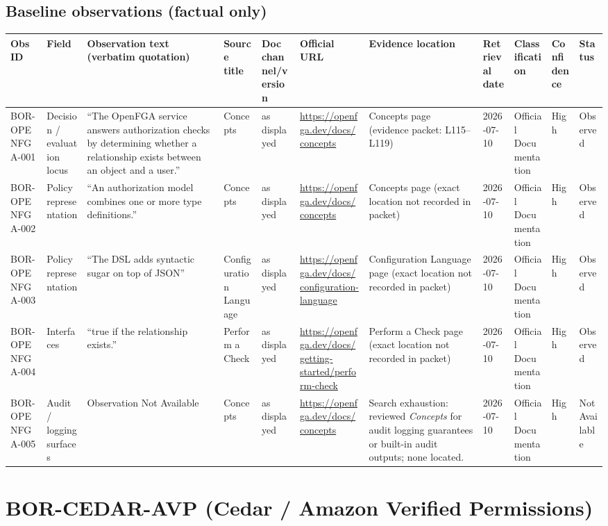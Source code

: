 \documentclass[11pt]{article}
\begin{document}
\subsection*{Baseline observations (factual only)}
\begin{longtable}{@{}L{0.95in}L{1.05in}L{2.05in}L{1.55in}L{0.95in}L{1.55in}L{1.10in}L{0.75in}L{0.95in}L{0.75in}L{0.8in}@{}}
\toprule
Obs ID & Field & Observation text (verbatim quotation) & Source title & Doc channel/version & Official URL & Evidence location & Retrieval date & Classification & Confidence & Status\\
\midrule
\endhead
BOR-OPENFGA-001 & Decision / evaluation locus & ``The OpenFGA service answers authorization checks by determining whether a relationship exists between an object and a user.'' & Concepts & as displayed & \url{https://openfga.dev/docs/concepts} & Concepts page (evidence packet: L115--L119) & 2026-07-10 & Official Documentation & High & Observed\\
BOR-OPENFGA-002 & Policy representation & ``An authorization model combines one or more type definitions.'' & Concepts & as displayed & \url{https://openfga.dev/docs/concepts} & Concepts page (exact location not recorded in packet) & 2026-07-10 & Official Documentation & High & Observed\\
BOR-OPENFGA-003 & Policy representation & ``The DSL adds syntactic sugar on top of JSON'' & Configuration Language & as displayed & \url{https://openfga.dev/docs/configuration-language} & Configuration Language page (exact location not recorded in packet) & 2026-07-10 & Official Documentation & High & Observed\\
BOR-OPENFGA-004 & Interfaces & ``true if the relationship exists.'' & Perform a Check & as displayed & \url{https://openfga.dev/docs/getting-started/perform-check} & Perform a Check page (exact location not recorded in packet) & 2026-07-10 & Official Documentation & High & Observed\\
BOR-OPENFGA-005 & Audit / logging surfaces & Observation Not Available & Concepts & as displayed & \url{https://openfga.dev/docs/concepts} & Search exhaustion: reviewed \textit{Concepts} for audit logging guarantees or built-in audit outputs; none located. & 2026-07-10 & Official Documentation & High & Not Available\\
\bottomrule
\end{longtable}

\section*{BOR-CEDAR-AVP (Cedar / Amazon Verified Permissions)}
\end{document}

